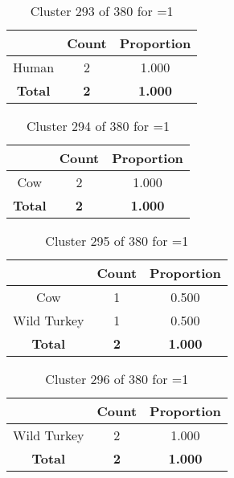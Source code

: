 \begin{table}[ht!]
\centering
\begin{tabular}{|c|c|c|}
\hline
\bf \Spec{} &\bf Count &\bf Proportion\\ \hline \hline
Human & 2 & 1.000\\ \hline
\hline
\bf Total & \bf 2 & \bf 1.000\\ \hline
\end{tabular}
\label{tab:cluster:293:1}
\caption{Cluster 293 of 380 for \minneigh{}=1}
\end{table}

\begin{table}[ht!]
\centering
\begin{tabular}{|c|c|c|}
\hline
\bf \Spec{} &\bf Count &\bf Proportion\\ \hline \hline
Cow & 2 & 1.000\\ \hline
\hline
\bf Total & \bf 2 & \bf 1.000\\ \hline
\end{tabular}
\label{tab:cluster:294:1}
\caption{Cluster 294 of 380 for \minneigh{}=1}
\end{table}

\begin{table}[ht!]
\centering
\begin{tabular}{|c|c|c|}
\hline
\bf \Spec{} &\bf Count &\bf Proportion\\ \hline \hline
Cow & 1 & 0.500\\ \hline
Wild Turkey & 1 & 0.500\\ \hline
\hline
\bf Total & \bf 2 & \bf 1.000\\ \hline
\end{tabular}
\label{tab:cluster:295:1}
\caption{Cluster 295 of 380 for \minneigh{}=1}
\end{table}

\begin{table}[ht!]
\centering
\begin{tabular}{|c|c|c|}
\hline
\bf \Spec{} &\bf Count &\bf Proportion\\ \hline \hline
Wild Turkey & 2 & 1.000\\ \hline
\hline
\bf Total & \bf 2 & \bf 1.000\\ \hline
\end{tabular}
\label{tab:cluster:296:1}
\caption{Cluster 296 of 380 for \minneigh{}=1}
\end{table}

